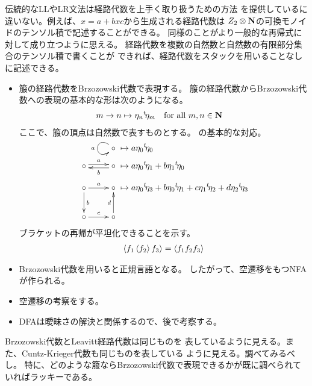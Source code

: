 	\begin{todo}[ここまで]\label{todo:ここまで} %
		\begin{description}\setlength{\itemsep}{-1mm} %
			\item[経路代数] 伝統的なLLやLR文法は経路代数を上手く取り扱うための方法
			を提供しているに違いない。例えば、$x=a+bxc$から生成される経路代数は
			$Z_2\otimes{\ensuremath{\mathbf{N}}}$の可換モノイドのテンソル積で記述することができる。
			同様のことがより一般的な再帰式に対して成り立つように思える。
			経路代数を複数の自然数と自然数の有限部分集合のテンソル積で書くことが
			できれば、経路代数をスタックを用いることなしに記述できる。
			\item[話の順序] 
			\begin{itemize}\setlength{\itemsep}{-1mm} %
				\item 箙の経路代数をBrzozowski代数で表現する。
				箙の経路代数からBrzozowski代数への表現の基本的な形は次のようになる。
				\begin{equation*}\begin{split} %
					m \xrightarrow{} n &\mapsto \eta_n\lu{t}\eta_m
					\quad\text{for all }m,n\in\sizen
				\end{split}\end{equation*} %
				ここで、箙の頂点は自然数で表すものとする。
				の基本的な対応。
				\begin{equation*}\begin{split} %
					\xymatrix{
						\circ \ar@(ul,dl)_a
					} &\mapsto a\eta_0\lu{t}{\eta_0} \\
					\xymatrix{
						\circ \ar@<2pt>[r]^a & \circ \ar@<2pt>[l]^b
					} &\mapsto a\eta_0\lu{t}{\eta_1} + b\eta_1\lu{t}{\eta_0} \\
					\xymatrix{
						\circ \ar[r]^a \ar[d]^b & \circ \\
						\circ \ar[r]^c & \circ \ar[u]^d
					} &\mapsto a\eta_0\lu{t}{\eta_3} + b\eta_0\lu{t}{\eta_1}
						+ c\eta_1\lu{t}{\eta_2} + d\eta_2\lu{t}{\eta_3} \\
				\end{split}\end{equation*} %
				ブラケットの再帰が平坦化できることを示す。
				\begin{equation*}\begin{split} %
					\braket{f_1\braket{f_2}f_3} = \braket{f_1f_2f_3}
				\end{split}\end{equation*} %
				\item Brzozowski代数を用いると正規言語となる。
				したがって、空遷移をもつNFAが作られる。
				\item 空遷移の考察をする。
				\item DFAは曖昧さの解決と関係するので、後で考察する。
			\end{itemize} %
			\item[Leavitt経路代数] Brzozowski代数とLeavitt経路代数は同じものを
			表しているように見える。また、Cuntz-Krieger代数も同じものを表している
			ように見える。調べてみるべし。
			特に、どのような箙ならBrzozowski代数で表現できるかが既に調べられて
			いればラッキーである。
		\end{description} %
	\end{todo} %


